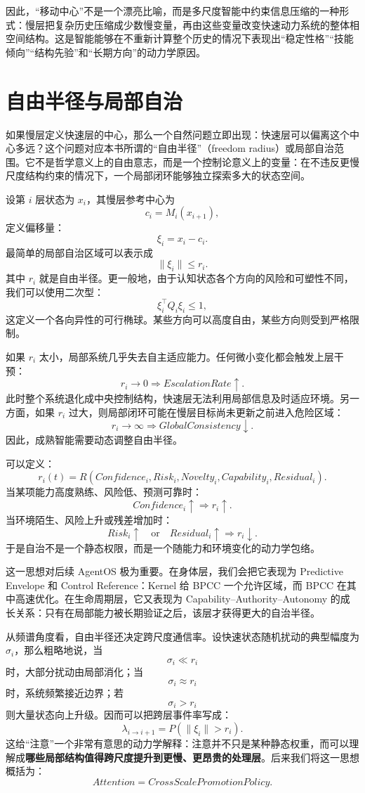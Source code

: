 因此，“移动中心”不是一个漂亮比喻，而是多尺度智能中约束信息压缩的一种形式：慢层把复杂历史压缩成少数慢变量，再由这些变量改变快速动力系统的整体相空间结构。这是智能能够在不重新计算整个历史的情况下表现出“稳定性格”“技能倾向”“结构先验”和“长期方向”的动力学原因。

\section{自由半径与局部自治}

如果慢层定义快速层的中心，那么一个自然问题立即出现：快速层可以偏离这个中心多远？这个问题对应本书所谓的“自由半径”（freedom radius）或局部自治范围。它不是哲学意义上的自由意志，而是一个控制论意义上的变量：在不违反更慢尺度结构约束的情况下，一个局部闭环能够独立探索多大的状态空间。

设第 $i$ 层状态为 $x_i$，其慢层参考中心为
\[
c_i
=
M_i(x_{i+1}),
\]
定义偏移量：
\[
\xi_i
=
x_i-c_i.
\]
最简单的局部自治区域可以表示成
\[
\|\xi_i\|
\leq
r_i.
\]
其中 $r_i$ 就是自由半径。更一般地，由于认知状态各个方向的风险和可塑性不同，我们可以使用二次型：
\[
\xi_i^{\top}
Q_i
\xi_i
\leq
1,
\]
这定义一个各向异性的可行椭球。某些方向可以高度自由，某些方向则受到严格限制。

如果 $r_i$ 太小，局部系统几乎失去自主适应能力。任何微小变化都会触发上层干预：
\[
r_i\rightarrow0
\Rightarrow
EscalationRate\uparrow.
\]
此时整个系统退化成中央控制结构，快速层无法利用局部信息及时适应环境。另一方面，如果 $r_i$ 过大，则局部闭环可能在慢层目标尚未更新之前进入危险区域：
\[
r_i\rightarrow\infty
\Rightarrow
GlobalConsistency\downarrow.
\]
因此，成熟智能需要动态调整自由半径。

可以定义：
\[
r_i(t)
=
R
\left(
Confidence_i,
Risk_i,
Novelty_i,
Capability_i,
Residual_i
\right).
\]
当某项能力高度熟练、风险低、预测可靠时：
\[
Confidence_i\uparrow
\Rightarrow
r_i\uparrow.
\]
当环境陌生、风险上升或残差增加时：
\[
Risk_i\uparrow
\quad\text{or}\quad
Residual_i\uparrow
\Rightarrow
r_i\downarrow.
\]
于是自治不是一个静态权限，而是一个随能力和环境变化的动力学包络。

这一思想对后续 AgentOS 极为重要。在身体层，我们会把它表现为 Predictive Envelope 和 Control Reference：Kernel 给 BPCC 一个允许区域，而 BPCC 在其中高速优化。在生命周期层，它又表现为 Capability--Authority--Autonomy 的成长关系：只有在局部能力被长期验证之后，该层才获得更大的自治半径。

从频谱角度看，自由半径还决定跨尺度通信率。设快速状态随机扰动的典型幅度为 $\sigma_i$，那么粗略地说，当
\[
\sigma_i
\ll
r_i
\]
时，大部分扰动由局部消化；当
\[
\sigma_i
\approx
r_i
\]
时，系统频繁接近边界；若
\[
\sigma_i
>
r_i
\]
则大量状态向上升级。因而可以把跨层事件率写成：
\[
\lambda_{i\rightarrow i+1}
=
P
\left(
\|\xi_i\|>r_i
\right).
\]
这给“注意”一个非常有意思的动力学解释：注意并不只是某种静态权重，而可以理解成\textbf{哪些局部结构值得跨尺度提升到更慢、更昂贵的处理层}。后来我们将这一思想概括为：
\[
\boxed{
Attention
=
CrossScalePromotionPolicy.
}
\]

